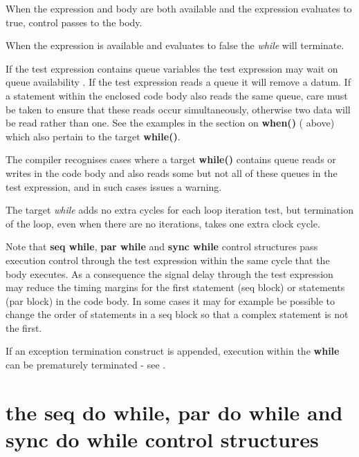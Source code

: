            When the expression and body are both available and the expression
            evaluates to true, control passes to the body.

            When the expression is available and evaluates to false the {\em
            while} will terminate.

            If the test expression contains queue variables the test expression may
            wait on queue availability . If the test
            expression reads a queue it will remove a datum. If a statement within
            the enclosed code body also reads the same queue, care must be taken to
            ensure that these reads occur simultaneously, otherwise two data will
            be read rather than one. See the examples in the section on {\bf
            when()} ( above) which also pertain to the
            target {\bf while()}.
            
            The compiler recognises cases where a target {\bf while()} contains
            queue reads or writes in the code body and also reads some but not
            all of these queues in the test expression, and in such cases issues
            a warning.
            
            The target {\em while} adds no extra cycles for each loop
            iteration test, but termination of the loop, even when there
            are no iterations, takes one extra clock cycle.

            Note that {\bf seq while}, {\bf par while} and {\bf sync while} control
            structures pass execution control through the test expression within the
            same cycle that the body executes. As a consequence the signal delay
            through the test expression may reduce the timing margins for the first
            statement (seq block) or statements (par block) in the code body. In
            some cases it may for example be possible to change the order of
            statements in a seq block so that a complex statement is not the first.

            If an exception termination construct is appended, execution within
            the {\bf while} can be prematurely terminated
            - see .



    \section{the {\bf seq do while}, {\bf par do while} and {\bf sync
                                            do while} control structures}

